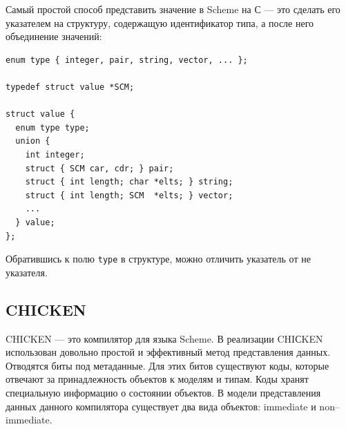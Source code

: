 Самый простой способ представить значение в Scheme на С --- это сделать его указателем на структуру, содержащую идентификатор типа, а после него объединение 
 значений:

\begin{lstlisting}
enum type { integer, pair, string, vector, ... };
  
typedef struct value *SCM;
  
struct value {
  enum type type;
  union {
    int integer;
    struct { SCM car, cdr; } pair;
    struct { int length; char *elts; } string;
    struct { int length; SCM  *elts; } vector;
    ...
  } value;
};
\end{lstlisting}

Обратившись к полю \texttt{type} в структуре, можно отличить указатель от не указателя.

\subsection {CHICKEN}

CHICKEN --- это компилятор для языка Scheme.
В реализации CHIСKEN использован довольно простой и эффективный метод представления данных.
Отводятся биты под метаданные. Для этих битов существуют коды, которые отвечают за
принадлежность объектов к моделям и типам. Коды хранят специальную информацию о состоянии объектов.
В  модели представления данных данного компилятора
существует два вида объектов: immediate и non--immediate.

